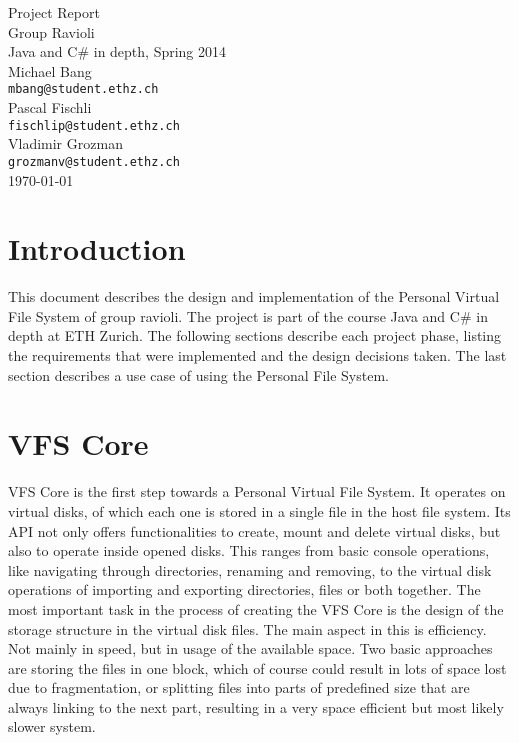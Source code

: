 \documentclass[11pt]{article}
\begin{document}
\begin{center}


\LARGE Project Report\\Group Ravioli \\[0.5cm]

\Large Java and C\# in depth, Spring 2014 \\[0.5cm]

\large Michael Bang\\\small\texttt{mbang@student.ethz.ch}\\[0.05cm]
\large Pascal Fischli\\\small\texttt{fischlip@student.ethz.ch}\\[0.05cm]
\large Vladimir Grozman\\\small\texttt{grozmanv@student.ethz.ch}\\[0.5cm]

{\large \today}\\[1.5cm]

\end{center}


\section{Introduction}
This document describes the design and implementation of the Personal Virtual File System of group ravioli. The project is part of the course Java and C\# in depth at ETH Zurich. The following sections describe each project phase, listing the requirements that were implemented and the design decisions taken. The last section describes a use case of using the Personal File System.

\section{VFS Core}
VFS Core is the first step towards a Personal Virtual File System. It operates on virtual disks, of which each one is stored in a single file in the host file system. Its API not only offers functionalities to create, mount and delete virtual disks, but also to operate inside opened disks. This ranges from basic console operations, like navigating through directories, renaming and removing, to the virtual disk operations of importing and exporting directories, files or both together.\newline
The most important task in the process of creating the VFS Core is the design of the storage structure in the virtual disk files. The main aspect in this is efficiency. Not mainly in speed, but in usage of the available space. Two basic approaches are storing the files in one block, which of course could result in lots of space lost due to fragmentation, or splitting files into parts of predefined size that are always linking to the next part, resulting in a very space efficient but most likely slower system.
\end{document}
